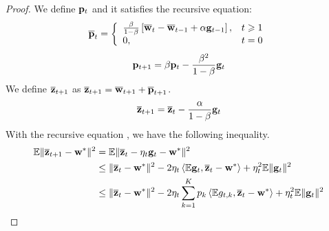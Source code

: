 \begin{proof}
We define ${\mathbf{p}}_t$ and it satisfies the recursive equation:
\begin{align}
	{\overline{\mathbf{p}}}_{t}=\left\{\begin{array}{ll}\frac{\beta}{1-\beta}\left[{\overline{\mathbf{w}}}_{t}-{\overline{\mathbf{w}}}_{t-1}+\alpha {\mathbf{g}}_{t-1}\right], & t \geqslant 1 \\ 0, & t=0\end{array}\right.
\end{align}
\begin{align}
	{\mathbf{p}}_{t+1} =  \beta {\mathbf{p}}_t - \frac{\beta^2}{1 - \beta} {\mathbf{g}}_t
	\label{eq:recursivep}
\end{align}
We define ${\overline{\mathbf{z}}}_{t+1}$ as ${\overline{\mathbf{z}}}_{t+1} = {\overline{\mathbf{w}}}_{t+1} + {\overline{\mathbf{p}}}_{t+1}$. 
\begin{align}
	\overline{{\mathbf{z}}}_{t+1} = \overline{{\mathbf{z}}}_{t} - \frac{\alpha}{1- \beta} {\mathbf{g}}_t
	\label{eq:nasgdzt}
\end{align}
With the recursive equation \eq{\ref{eq:nasgdzt}}, we have the following 
inequality.
\begin{align}
	\mathbb{E}\|\overline{{\mathbf{z}}}_{t+1} - {\mathbf{w}}^* \|^2  &= \mathbb{E}\|\overline{{\mathbf{z}}}_{t} - \eta_t{\mathbf{g}}_t - {\mathbf{w}}^* \|^2 \\
& \leq  \| \overline{{\mathbf{z}}}_{t} - {\mathbf{w}}^*\|^2  - 2\eta_t\left<\mathbb{E}{\mathbf{g}}_t, \overline{{\mathbf{z}}}_{t} - {\mathbf{w}}^*\right> +  \eta_t^2\mathbb{E}\|{\mathbf{g}}_t\|^2 \\
& \leq  \| \overline{{\mathbf{z}}}_{t} - {\mathbf{w}}^*\|^2  - 2\eta_t\sum_{k=1}^K p_k\left<\mathbb{E} g_{t,k}, \overline{{\mathbf{z}}}_{t} - {\mathbf{w}}^*\right> +  \eta_t^2\mathbb{E}\|{\mathbf{g}}_t\|^2 \label{eq:nagcvx1}
\end{align}


\end{proof}

